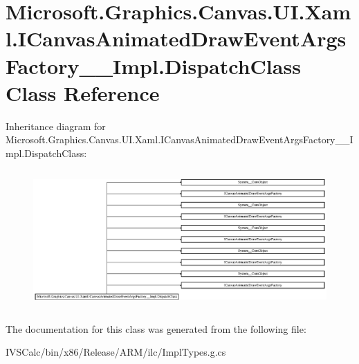 \hypertarget{class_microsoft_1_1_graphics_1_1_canvas_1_1_u_i_1_1_xaml_1_1_i_canvas_animated_draw_event_args_f6eadc47e07189b3944f4c0fa87b4e084}{}\section{Microsoft.\+Graphics.\+Canvas.\+U\+I.\+Xaml.\+I\+Canvas\+Animated\+Draw\+Event\+Args\+Factory\+\_\+\+\_\+\+Impl.\+Dispatch\+Class Class Reference}
\label{class_microsoft_1_1_graphics_1_1_canvas_1_1_u_i_1_1_xaml_1_1_i_canvas_animated_draw_event_args_f6eadc47e07189b3944f4c0fa87b4e084}
Inheritance diagram for Microsoft.\+Graphics.\+Canvas.\+U\+I.\+Xaml.\+I\+Canvas\+Animated\+Draw\+Event\+Args\+Factory\+\_\+\+\_\+\+Impl.\+Dispatch\+Class\+:\begin{figure}[H]
\begin{center}
\leavevmode
\includegraphics[height=5.337955cm]{class_microsoft_1_1_graphics_1_1_canvas_1_1_u_i_1_1_xaml_1_1_i_canvas_animated_draw_event_args_f6eadc47e07189b3944f4c0fa87b4e084}
\end{center}
\end{figure}


The documentation for this class was generated from the following file\+:\begin{DoxyCompactItemize}
\item 
I\+V\+S\+Calc/bin/x86/\+Release/\+A\+R\+M/ilc/Impl\+Types.\+g.\+cs\end{DoxyCompactItemize}
